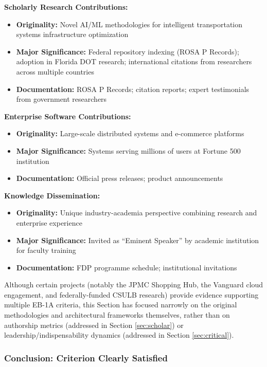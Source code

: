 \textbf{Scholarly Research Contributions:}
\begin{itemize}
    \item \textbf{Originality:} Novel AI/ML methodologies for intelligent transportation systems infrastructure optimization
    \item \textbf{Major Significance:} Federal repository indexing (ROSA P Records); adoption in Florida DOT research; international citations from researchers across multiple countries
    \item \textbf{Documentation:} ROSA P Records; citation reports; expert testimonials from government researchers
\end{itemize}

\textbf{Enterprise Software Contributions:}
\begin{itemize}
    \item \textbf{Originality:} Large-scale distributed systems and e-commerce platforms
    \item \textbf{Major Significance:} Systems serving millions of users at Fortune 500 institution
    \item \textbf{Documentation:} Official press releases; product announcements
\end{itemize}

\textbf{Knowledge Dissemination:}
\begin{itemize}
    \item \textbf{Originality:} Unique industry-academia perspective combining research and enterprise experience
    \item \textbf{Major Significance:} Invited as ``Eminent Speaker'' by academic institution for faculty training
    \item \textbf{Documentation:} FDP programme schedule; institutional invitations
\end{itemize}

Although certain projects (notably the JPMC Shopping Hub, the Vanguard cloud engagement, and federally-funded CSULB research) provide evidence supporting multiple EB-1A criteria, this Section has focused narrowly on the original methodologies and architectural frameworks themselves, rather than on authorship metrics (addressed in Section \ref{sec:scholar}) or leadership/indispensability dynamics (addressed in Section \ref{sec:critical}).

\subsubsection{Conclusion: Criterion Clearly Satisfied}
\label{original:conclusion}

